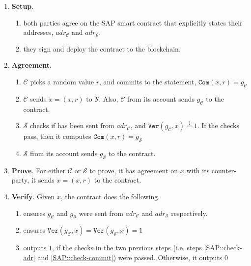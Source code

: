  \begin{enumerate}
 \item\textbf{Setup}.  

 \begin{enumerate}
  \item both parties agree on the SAP smart contract that  explicitly states their addresses, $adr_{\scriptscriptstyle\mathcal{C}}$ and $adr_{\scriptscriptstyle\mathcal{S}}$.
 \item they sign and deploy the contract to the blockchain.
   \end{enumerate}
    \item\textbf{Agreement}.
  \begin{enumerate}
   \item $\mathcal C$ picks a random value $r$, and commits to the statement, $\mathtt{Com}(x,r)=g_{\scriptscriptstyle \mathcal{C}}$
   
   
   \item $\mathcal C$ sends $\ddot{x}=(x,r)$  to  $\mathcal S$. Also, $\mathcal C$ from its account sends $g_{\scriptscriptstyle\mathcal C}$ to the contract. 
   \item $\mathcal S$ checks if has been sent from $adr_{\scriptscriptstyle \mathcal{C}}$, and $\mathtt{Ver}(g_{\scriptscriptstyle\mathcal C}, \ddot{x})\stackrel{?}=1$. If the checks pass, then  it computes $\mathtt{Com}(x,r)=g_{\scriptscriptstyle\mathcal S}$
   
   \item $\mathcal S$ from its account sends   $g_{\scriptscriptstyle\mathcal S}$ to the contract. 
    \end{enumerate}
   \item\textbf{Prove}. For either $\mathcal C$ or $\mathcal S$ to prove, it has agreement on $x$ with its counter-party, it sends $\ddot{x}=(x, r)$  to the contract. 
 \item\textbf{Verify}. Given $\ddot{x}$, the contract does the following. 
   \begin{enumerate}
   
\item\label{SAP::check-adr} ensures $g_{\scriptscriptstyle\mathcal C}$ and $g_{\scriptscriptstyle\mathcal S}$ were sent from   $adr_{\scriptscriptstyle \mathcal{C}}$ and  $adr_{\scriptscriptstyle \mathcal{S}}$  respectively. 
  
   \item\label{SAP::check-commit} ensures $\mathtt{Ver}(g_{\scriptscriptstyle\mathcal C},\ddot{x})=\mathtt{Ver}(g_{\scriptscriptstyle\mathcal S},\ddot{x}) =1$
   
   \item outputs $1$, if the checks in the two previous steps (i.e. steps \ref{SAP::check-adr} and \ref{SAP::check-commit}) were passed. Otherwise, it outputs $0$
    \end{enumerate}
 \end{enumerate}

